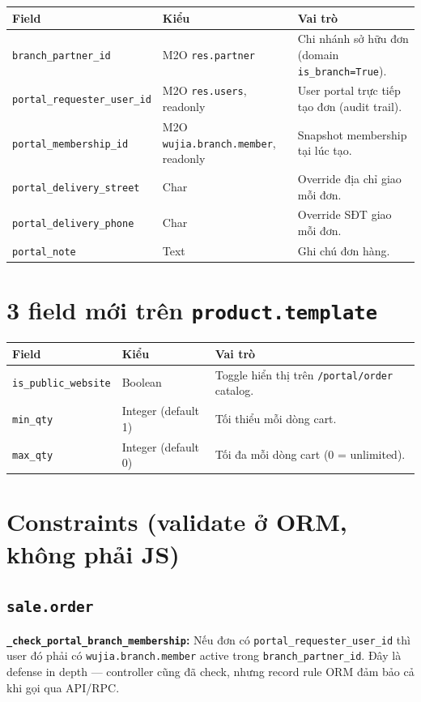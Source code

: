 \begin{longtable}{p{5cm} p{4cm} p{6cm}}
\toprule
\textbf{Field} & \textbf{Kiểu} & \textbf{Vai trò} \\
\midrule
\endhead
\texttt{branch\_partner\_id} & M2O \texttt{res.partner} & Chi nhánh sở hữu đơn (domain \texttt{is\_branch=True}). \\
\texttt{portal\_requester\_user\_id} & M2O \texttt{res.users}, readonly & User portal trực tiếp tạo đơn (audit trail). \\
\texttt{portal\_membership\_id} & M2O \texttt{wujia.branch.member}, readonly & Snapshot membership tại lúc tạo. \\
\texttt{portal\_delivery\_street} & Char & Override địa chỉ giao mỗi đơn. \\
\texttt{portal\_delivery\_phone} & Char & Override SĐT giao mỗi đơn. \\
\texttt{portal\_note} & Text & Ghi chú đơn hàng. \\
\bottomrule
\end{longtable}

\section{3 field mới trên \texttt{product.template}}

\begin{longtable}{p{4cm} p{3cm} p{8cm}}
\toprule
\textbf{Field} & \textbf{Kiểu} & \textbf{Vai trò} \\
\midrule
\endhead
\texttt{is\_public\_website} & Boolean & Toggle hiển thị trên \texttt{/portal/order} catalog. \\
\texttt{min\_qty} & Integer (default 1) & Tối thiểu mỗi dòng cart. \\
\texttt{max\_qty} & Integer (default 0) & Tối đa mỗi dòng cart (0 = unlimited). \\
\bottomrule
\end{longtable}

\section{Constraints (validate ở ORM, không phải JS)}

\subsection{\texttt{sale.order}}

\textbf{\texttt{\_check\_portal\_branch\_membership}:} Nếu đơn có \texttt{portal\_requester\_user\_id} thì user đó phải có \texttt{wujia.branch.member} active trong \texttt{branch\_partner\_id}. Đây là defense in depth — controller cũng đã check, nhưng record rule ORM đảm bảo cả khi gọi qua API/RPC.

